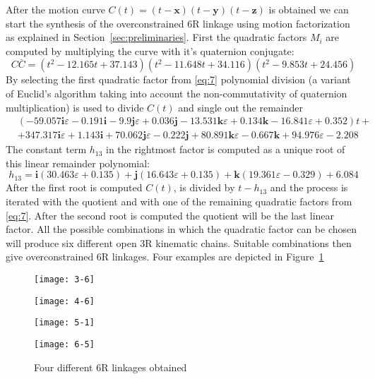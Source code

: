 \documentclass{scrartcl}
\renewcommand{\vec}[1]{\mathbf{#1}}
\newcommand{\eps}{\varepsilon}
\newcommand{\qi}{\mathbf{i}}
\newcommand{\qj}{\mathbf{j}}
\newcommand{\qk}{\mathbf{k}}
\newcommand{\cj}[1]{\overline{#1}}
\begin{document}
After the motion curve $C(t) = (t-\vec{x})(t-\vec{y})(t-\vec{z})$ is obtained we can
start the synthesis of the overconstrained 6R linkage using motion factorization
\cite{journal factorization RJ} as explained in Section~\ref{sec:preliminaries}.
First the quadratic factors $M_i$ are computed by multiplying the curve with
it's quaternion conjugate:
\begin{equation}
  \label{eq:7}
  C\cj{C} = (t^2-12.165t+37.143)(t^2-11.648t+34.116)(t^2-9.853t+24.456)
\end{equation} 
By selecting the first quadratic factor from \eqref{eq:7} polynomial
division (a variant of Euclid's algorithm taking into account the non-commutativity of quaternion multiplication) is used to divide $C(t)$ and single out the remainder
\begin{equation}
  \label{eq:10}
\begin{aligned}
  &(-59.057 \qi \eps-0.191 \qi-9.9 \qj \eps+0.036 \qj-13.531 \qk \eps+ 0.134 \qk-16.841 \eps+ 0.352) t+ \\
  &+347.317 \qi \eps+1.143 \qi+70.062 \qj \eps- 0.222 \qj+80.891 \qk \eps-0.667 \qk+94.976 \eps-2.208   
\end{aligned}
\end{equation}
The constant term $h_{13}$ in the rightmost factor is computed as a unique root of
this linear remainder polynomial:
\begin{equation}
  h_{13} = \qi (30.463 \eps+0.135)+\qj (16.643 \eps+0.135)+ \qk (19.361 \eps-0.329)+6.084
\end{equation}
After the first root is computed $C(t)$, is divided by $t-h_{13}$ and the
process is iterated with the quotient and with one of the remaining quadratic
factors from \eqref{eq:7}. After the second root is computed the quotient will
be the last linear factor. All the possible combinations in which the quadratic
factor can be chosen will produce six different open 3R kinematic chains.
Suitable combinations \cite{journal factorization RJ} then give overconstrained
6R linkages. Four examples are depicted in Figure~\ref{fig:2}
 
\begin{figure}
  \centering
  \begin{minipage}[b]{0.45\linewidth}
    \centering
    \texttt{[image: 3-6]} 
  \end{minipage}
  \begin{minipage}[b]{0.45\linewidth}
    \centering
    \texttt{[image: 4-6]} 
  \end{minipage} 
  \begin{minipage}[b]{0.45\linewidth}
    \centering
    \texttt{[image: 5-1]} 
  \end{minipage}
  \begin{minipage}[b]{0.45\linewidth}
    \centering
    \texttt{[image: 6-5]} 
  \end{minipage} 
  \caption{Four different 6R linkages obtained}
  \label{fig:2} 
\end{figure}
 
\end{document}
